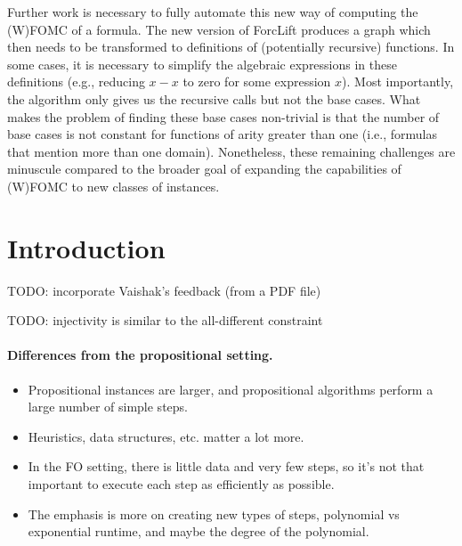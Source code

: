 
Further work is necessary to fully automate this new way of computing the (W)FOMC of a formula. The new version of ForcLift produces a graph which then needs to be transformed to definitions of (potentially recursive) functions. In some cases, it is necessary to simplify the algebraic expressions in these definitions (e.g., reducing $x-x$ to zero for some expression $x$). Most importantly, the algorithm only gives us the recursive calls but not the base cases. What makes the problem of finding these base cases non-trivial is that the number of base cases is not constant for functions of arity greater than one (i.e., formulas that mention more than one domain). Nonetheless, these remaining challenges are minuscule compared to the broader goal of expanding the capabilities of (W)FOMC to new classes of instances.


\section{Introduction}

TODO: incorporate Vaishak's feedback (from a PDF file)

TODO: injectivity is similar to the all-different constraint

\paragraph{Differences from the propositional setting.}
\begin{itemize}
\item Propositional instances are larger, and propositional algorithms perform a large number of simple steps.
\item Heuristics, data structures, etc. matter a lot more.
\item In the FO setting, there is little data and very few steps, so it's not that important to execute each step as efficiently as possible.
\item The emphasis is more on creating new types of steps, polynomial vs exponential runtime, and maybe the degree of the polynomial.
\end{itemize}

